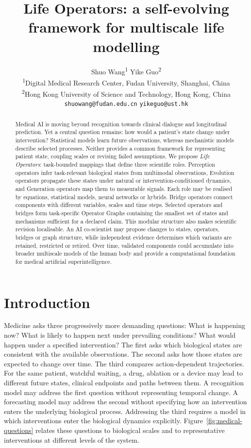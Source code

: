 \documentclass[12pt, letterpaper]{article} %
\title{
\textbf{Life Operators: a self-evolving framework for multiscale life modelling}}
\author{
  Shuo Wang\textsuperscript{1} \qquad Yike Guo\textsuperscript{2}\\[0.75em]
  \small \textsuperscript{1}Digital Medical Research Center, Fudan University, Shanghai, China\\
  \small \textsuperscript{2}Hong Kong University of Science and Technology, Hong Kong, China\\[0.5em]
  \small \texttt{shuowang@fudan.edu.cn} \qquad \texttt{yikeguo@ust.hk}
}
\date{}
\begin{document}
\maketitle

\begin{abstract}

Medical AI is moving beyond recognition towards clinical dialogue and longitudinal prediction. Yet a central question remains: how would a patient's state change under intervention?
Statistical models learn future observations, whereas mechanistic models describe selected processes. Neither provides a common framework for representing patient state, coupling scales or revising failed assumptions. We propose \emph{Life Operators}: task-bounded mappings that define three scientific roles. Perception operators infer task-relevant biological states from multimodal observations, Evolution operators propagate these states under natural or intervention-conditioned dynamics, and Generation operators map them to measurable signals. Each role may be realised by equations, statistical models, neural networks or hybrids.
Bridge operators connect components with different variables, scales and time steps. Selected operators and bridges form task-specific Operator Graphs containing the smallest set of states and mechanisms sufficient for a declared claim.
This modular structure also makes scientific revision localisable. An AI co-scientist may propose changes to states, operators, bridges or graph structure, while independent evidence determines which variants are retained, restricted or retired. Over time, validated components could accumulate into broader multiscale models of the human body and provide a computational foundation for medical artificial superintelligence.

\end{abstract}

\section{Introduction}
Medicine asks three progressively more demanding questions: What is happening now? What is likely to happen next under prevailing conditions? What would happen under a specified intervention? The first asks which biological states are consistent with the available observations. The second asks how those states are expected to change over time. The third compares action-dependent trajectories. For the same patient, watchful waiting, a drug, ablation or a device may lead to different future states, clinical endpoints and paths between them. A recognition model may address the first question without representing temporal change. A forecasting model may address the second without specifying how an intervention enters the underlying biological process. Addressing the third requires a model in which interventions enter the biological dynamics explicitly. Figure~\ref{fig:medical-questions} relates these questions to biological scales and to representative interventions at different levels of the system.
\end{document}
